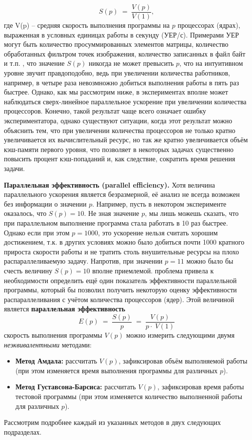 {	\begin{equation}
		S(p)\;=\;\frac{V(p)}{V(1)},
	\end{equation}
	где V(p) – средняя скорость выполнения программы на $p$ процессорах (ядрах), выраженная в условных единицах работы в секунду (УЕР/с). Примерами УЕР могут быть количество просуммированных элементов матрицы, количество обработанных фильтром точек изображения, количество записанных в файл байт и т.п.
	, что значение $S(p)$ никогда не может превысить $p$, что на интуитивном уровне звучит правдоподобно, ведь при увеличении количества работников, например, в четыре раза невозмножно добиться выполнения работы в пять раз быстрее.  Однако, как мы рассмотрим ниже, в экспериментах вполне может наблюдаться сверх-линейное параллельное ускорение при увеличении количества процессоров. Конечно, такой результат чаще всего означает ошибку экспериментатора, однако существуют ситуации, когда этот результат можно объяснить тем, что при увеличении количества процессоров не только кратно увеличивается их вычислительный ресурс, но так же кратно увеличивается объём кэш-памяти первого уровня, что позволяет в некоторых задачах существенно повысить процент кэш-попаданий и, как следствие, сократить время решения задачи.
	\par\textbf{Параллельная эффективность (parallel efficiency).} Хотя величина параллельного ускорения является безразмерной, её анализ не всегда возможен без информации о значении $p$. Например, пусть в некотором эксперименте оказалось, что $S(p)=10$. Не зная значение $p$, мы лишь можешь сказать, что при параллельном выполнение программа стала работать в 10 раз быстрее. Однако если при этом $p=1000$, это ускорение нельзя считать хорошим достижением, т.к. в других условиях можно было добиться почти 1000 кратного прироста скорости работы и не тратить столь внушительные ресурсы на плохо распараллеливаемую задачу. Напротив, при значении $p=11$ можно было бы счесть  величину $S(p)=10$ вполне приемлемой.
	 проблема привела к необходимости определить ещё один показатель эффективности параллельной программы, который бы позволил получить некоторую оценку эффективности распараллеливания с учётом  количества процессоров (ядер). Этой величиной является \textbf{параллельная эффективность}
	\begin{equation}
		E(p)\;=\;\frac{S(p)}p\;=\;\frac{V(p)}{p\cdot\;V(1)}
	\end{equation}
	 скорость выполнения программы $V(p)$ можно измерить следующими двумя \textit{неэквивалентными} методами:
	\begin{itemize}
		\item\textbf{Метод Амдала:} рассчитать $V(p)$, зафиксировав объём выполняемой работы (при этом изменяется время выполнения программы для различных $p$).
		\item\textbf{Метод Густавсона-Барсиса:} рассчитать $V(p)$, зафиксировав время работы тестовой программы (при этом изменяется количество выполненной работы для различных $p$).
	\end{itemize}
	Рассмотрим подробнее каждый из указанных методов в двух следующих подразделах.
	\par
}